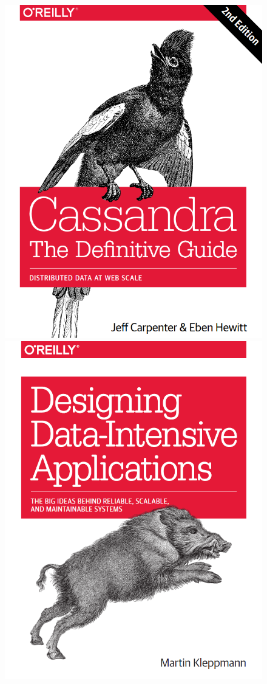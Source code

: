 \begin{frame}[c]
\begin{figure}[ht]
\begin{minipage}[c][1\width]{0.3\textwidth}
			\includegraphics[width=.9\linewidth,height=.7\textheight]{./Figures/chapter-00/cassandra.png}
		\end{minipage}
		\hfill
		\begin{minipage}[c][1\width]{0.3\textwidth}
			\centering
			\includegraphics[width=.9\linewidth,height=.7\textheight]{./Figures/chapter-00/ddi.png}
		\end{minipage}
		

\end{figure}
\end{frame}
